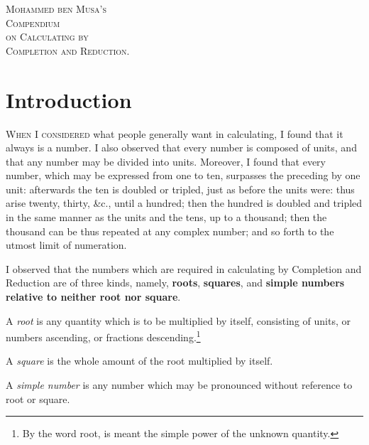 \clearpage

\begin{center}
{\LARGE\scshape Mohammed ben Musa's}\\[0.5cm]
{\Large\scshape Compendium}\\[0.3cm]
{\large\scshape on Calculating by}\\[0.3cm]
{\Large\scshape Completion and Reduction.}
\end{center}

\vspace{0.5cm}

\section*{Introduction}

\lettrine{W}{hen I considered} what people generally want in calculating, I found that it always is a number. I also observed that every number is composed of units, and that any number may be divided into units. Moreover, I found that every number, which may be expressed from one to ten, surpasses the preceding by one unit: afterwards the ten is doubled or tripled, just as before the units were: thus arise twenty, thirty, \&c., until a hundred; then the hundred is doubled and tripled in the same manner as the units and the tens, up to a thousand; then the thousand can be thus repeated at any complex number; and so forth to the utmost limit of numeration.

I observed that the numbers which are required in calculating by Completion and Reduction are of three kinds, namely, \textbf{roots}, \textbf{squares}, and \textbf{simple numbers relative to neither root nor square}.

A \textit{root} is any quantity which is to be multiplied by itself, consisting of units, or numbers ascending, or fractions descending.\footnote{By the word root, is meant the simple power of the unknown quantity.}

A \textit{square} is the whole amount of the root multiplied by itself.

A \textit{simple number} is any number which may be pronounced without reference to root or square.

